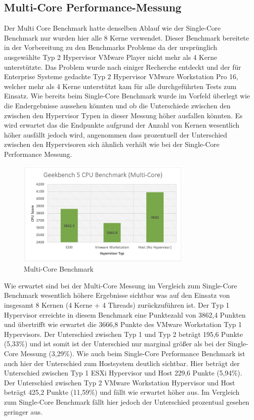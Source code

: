 \documentclass[conference]{IEEEtran}
\begin{document}
\subsection{Multi-Core Performance-Messung}
Der Multi Core Benchmark hatte denselben Ablauf wie der Single-Core Benchmark nur wurden hier alle 8 Kerne verwendet. Dieser Benchmark bereitete in der Vorbereitung zu den Benchmarks Probleme da der ursprünglich ausgewählte Typ 2 Hypervisor VMware Player nicht mehr als 4 Kerne unterstützte. Das Problem wurde nach einiger Recherche entdeckt und der für Enterprise Systeme gedachte Typ 2 Hypervisor VMware Workstation Pro 16, welcher mehr als 4 Kerne unterstützt kam für alle durchgeführten Tests zum Einsatz.
Wie bereits beim Single-Core Benchmark wurde im Vorfeld überlegt wie die Endergebnisse aussehen könnten und ob die Unterschiede zwischen den zwischen den Hypervisor Typen in dieser Messung höher ausfallen könnten. Es wird erwartet das die Endpunkte aufgrund der Anzahl von Kernen wesentlich höher ausfällt jedoch wird, angenommen dass prozentuell der Unterschied zwischen den Hypervisoren sich ähnlich verhält wie bei der Single-Core Performance Messung. \newline

\begin{figure}[!h]
	\centering
	\includegraphics[keepaspectratio,width=8.5cm,height=0.75\textheight]{multicore.png}
	\caption{Multi-Core Benchmark}
	\label{multicore}
\end{figure}

Wie erwartet sind bei der Multi-Core Messung im Vergleich zum Single-Core Benchmark wesentlich höhere Ergebnisse sichtbar was auf den Einsatz von insgesamt 8 Kernen (4 Kerne + 4 Threads) zurückzuführen ist. Der Typ 1 Hypervisor erreichte in diesem Benchmark eine Punktezahl von 3862,4 Punkten und übertrifft wie erwartet die 3666,8 Punkte des VMware Workstation Typ 1 Hypervisors. Der Unterschied zwischen Typ 1 und Typ 2 beträgt 195,6 Punkte (5,33\%) und ist somit ist der Unterschied nur marginal größer als bei der Single-Core Messung (3,29\%). Wie auch beim Single-Core Performance Benchmark ist auch hier der Unterschied zum Hostsystem deutlich sichtbar. Hier beträgt der Unterschied zwischen Typ 1 ESXi Hypervisor und Host 229,6 Punkte (5,94\%). Der Unterschied zwischen Typ 2 VMware Workstation Hypervisor und Host beträgt 425,2 Punkte (11,59\%) und fällt wie erwartet höher aus. Im Vergleich zum Single-Core Benchmark fällt hier jedoch der Unterschied prozentual gesehen geringer aus.
\end{document}
